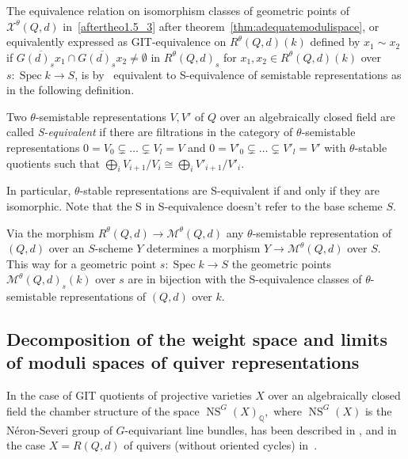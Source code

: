 \documentclass[ALCO,ThmDefs,Unicode,epreuves]{cedram}
\def\Q{\mathds Q}
\DeclareMathOperator{\Spec}{Spec}
\DeclareMathOperator{\NS}{NS}
\begin{document}
The equivalence relation on isomorphism classes of geometric points of 
$\mathcal X^\theta(Q,d)$ in~\ref{aftertheo1.5_3} after theorem~\ref{thm:adequatemodulispace},
or equivalently expressed as GIT-equivalence on $R^\theta(Q,d)(k)$
defined by $x_1\sim x_2$ if 
$\overline{G(d)_sx_1}\cap\overline{G(d)_sx_2}\neq\emptyset$
in $R^\theta(Q,d)_s$ for $x_1,x_2\in R^\theta(Q,d)(k)$ 
over $s\colon\Spec k\to S$, 
is by~\cite{Ki94} equivalent to S-equivalence of semistable representations 
as in the following definition.

\begin{defi}
Two $\theta$-semistable representations $V,V'$ of $Q$ over an algebraically 
closed field are called {\it S-equivalent} if there are filtrations in the 
category of $\theta$-semistable representations
$0=V_0\subsetneq\ldots\subsetneq V_l=V$ and $0=V'_0\subsetneq\ldots\subsetneq V'_l=V'$ 
with $\theta$-stable quotients such that 
$\bigoplus_iV_{i+1}/V_i\cong\bigoplus_iV'_{i+1}/V'_i$.
\end{defi}

In particular, $\theta$-stable representations are S-equivalent 
if and only if they are isomorphic. Note that the S in S-equivalence doesn't 
refer to the base scheme $S$.

\begin{coro}
Via the morphism $R^\theta(Q,d)\to\mathcal M^\theta(Q,d)$
any $\theta$-semistable representation of $(Q,d)$ over an $S$-scheme $Y$
determines a morphism $Y\to\mathcal M^\theta(Q,d)$ over $S$.
This way for a geometric point $s\colon\Spec k\to S$ the geometric points 
$\mathcal M^\theta(Q,d)_s(k)$ over $s$ are in bijection with 
the S-equivalence classes of $\theta$-semistable representations
of $(Q,d)$ over $k$.
\end{coro}


\subsection{Decomposition of the weight space and limits of moduli spaces of quiver representations}
\label{subsec:weightspace-limitfunctor}

In the case of GIT quotients of projective varieties $X$ over an algebraically closed 
field the chamber structure of the space $\NS^G(X)_\Q,$ where $\NS^G(X)$ is the 
N\'eron-Severi group of $G$-equivariant line bundles, has been described in 
\cite{Th96, DH98, Re00}, and in the case $X=R(Q,d)$ of quivers 
(without oriented cycles) in~\cite{HP02, Ch08}. 
\end{document}
